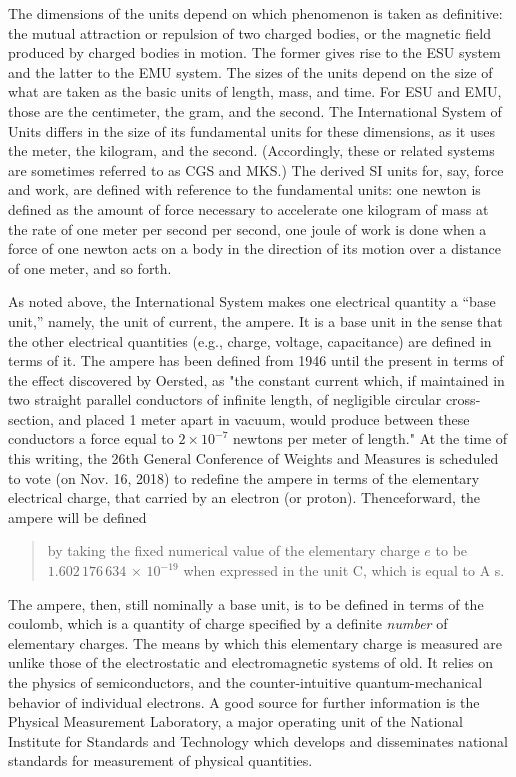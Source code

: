 The dimensions of the units depend on which phenomenon is taken as definitive: 
the mutual attraction or repulsion of two charged bodies, or the magnetic field 
produced by charged bodies in motion. The former gives rise to the ESU system
and the latter to the EMU system. The sizes of the units depend on the size of
what are taken as the basic units of length, mass, and time. For ESU and EMU,
those are the centimeter, the gram, and the second. The International System
of Units differs in the size of its fundamental units for these dimensions, as
it uses the meter, the kilogram, and the second. (Accordingly, these or related
systems are sometimes referred to as CGS and MKS.) The derived SI units for, say, 
force and work, are defined with reference to the fundamental units: one newton 
is defined as the amount of force necessary to accelerate one kilogram of mass 
at the rate of one meter per second per second, one joule of work is done when a 
force of one newton acts on a body in the direction of its motion over a distance 
of one meter, and so forth.

As noted above, the International System makes one electrical quantity a ``base unit,'' 
namely, the unit of current, the ampere. It is a base unit in the sense that the other
electrical quantities (e.g., charge, voltage, capacitance) are defined in terms of it. The ampere
has been defined from 1946 until the present in terms of the effect discovered by 
Oersted, as "the constant current which, 
if maintained in two straight parallel conductors of infinite length, of 
negligible circular cross-section, and placed 1 meter apart in vacuum, would produce 
between these conductors a force equal to $2\!\times\!10^{-7}$ newtons per meter 
of length." At the time of this writing, the 26th General Conference of Weights
and Measures is scheduled to vote (on Nov. 16, 2018) to redefine the ampere
in terms of the elementary electrical charge, that carried by an electron (or proton).
Thenceforward, the ampere will be defined 
\begin{quote}
by taking the fixed numerical value of the elementary charge $e$ to be $1.602\, 176\, 634\, 
\times \, 10^{-19}$ when expressed in the unit C, which is equal to A s.
\end{quote}
The ampere, then, still nominally a base unit, is to be defined in terms of the coulomb, 
which is a quantity of charge specified by a definite \emph{number} of elementary charges.
The means by which this elementary charge is measured are unlike those of the
electrostatic and electromagnetic systems of old. It relies on the physics of semiconductors,
and the counter-intuitive quantum-mechanical behavior of individual electrons. A good source
for further information is the Physical Measurement Laboratory, a major operating unit of the 
National Institute for Standards and Technology which develops and disseminates national
standards for measurement of physical quantities.


